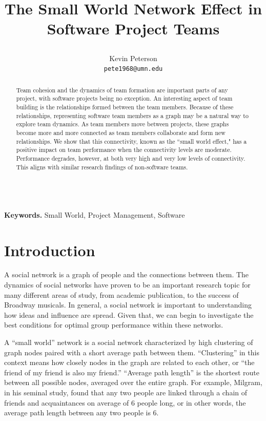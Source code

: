 \documentclass{proc}
\title{
The Small World Network Effect in Software Project Teams
\author{Kevin Peterson\\
\small \texttt{pete1968@umn.edu}
}
}
\begin{document}
\maketitle

\begin{abstract}
Team cohesion and the dynamics of team formation are important parts of any project, with software projects being no exception. An interesting aspect of team building is the relationships formed between the team members. Because of these relationships, representing software team members as a graph may be a natural way to explore team dynamics. As team members move between projects, these graphs become more and more connected as team members collaborate and form new relationships. We show that this connectivity, known as the ``small world effect," has a positive impact on team performance when the connectivity levels are moderate. Performance degrades, however, at both very high and very low levels of connectivity. This aligns with similar research findings of non-software teams.
\end{abstract}

\noindent \\\textbf{Keywords.} Small World, Project Management, Software

\section{Introduction}
A social network is a graph of people and the connections between them. The dynamics of social networks have proven to be an important research topic for many different areas of study, from academic publication\cite{barabasi2002evolution}, to the success of Broadway musicals\cite{uzzi2005collaboration}. In general, a social network is important to understanding how ideas and influence are spread\cite{kempe2003maximizing}. Given that, we can begin to investigate the best conditions for optimal group performance within these networks.

A ``small world'' network is a social network characterized by high clustering of graph nodes paired with a short average path between them\cite{watts1998collective}. ``Clustering'' in this context means how closely nodes in the graph are related to each other, or ``the friend of my friend is also my friend.'' ``Average path length'' is the shortest route between all possible nodes, averaged over the entire graph. For example, Milgram, in his seminal study, found that any two people are linked through a chain of friends and acquaintances on average of 6 people long\cite{milgram1967small}, or in other words, the average path length between any two people is 6.
\end{document}

